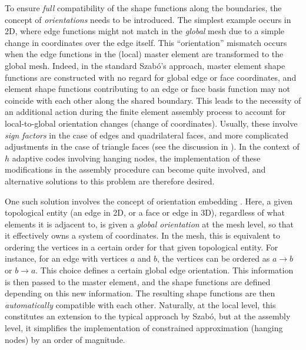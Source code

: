 To ensure \textit{full} compatibility of the shape functions along the boundaries, the concept of \textit{orientations} needs to be introduced.
The simplest example occurs in 2D, where edge functions might not match in the \textit{global} mesh due to a simple change in coordinates over the edge itself.
This ``orientation'' mismatch occurs when the edge functions in the (local) master element are transformed to the global mesh.
Indeed, in the standard Szab\'o's approach, master element shape functions are constructed with no regard for global edge or face coordinates, and element shape functions contributing to an edge or face basis function may not coincide with each other along the shared boundary.
This leads to the necessity of an additional action during the finite element assembly process to account for local-to-global orientation changes (change of coordinates).
Usually, these involve \textit{sign factors} in the case of edges and quadrilateral faces, and more complicated adjustments in the case of triangle faces (see the discussion in \citet[p.50]{hpbook2}).
In the context of $h$ adaptive codes involving hanging nodes, the implementation of these modifications in the assembly procedure can become quite involved, and alternative solutions to this problem are therefore desired.

One such solution involves the concept of orientation embedding \citep{GattoDemkowicz10}.
Here, a given topological entity (an edge in 2D, or a face or edge in 3D), regardless of what elements it is adjacent to, is given a \textit{global orientation} at the mesh level, so that it effectively owns a system of coordinates.
In the mesh, this is equivalent to ordering the vertices in a certain order for that given topological entity.
For instance, for an edge with vertices $a$ and $b$, the vertices can be ordered as $a\to b$ or $b\to a$. 
This choice defines a certain global edge orientation.
This information is then passed to the master element, and the shape functions are defined depending on this new information.
The resulting shape functions are then \textit{automatically} compatible with each other.
Naturally, at the local level, this constitutes an extension to the typical approach by Szab\'o, but at the assembly level, it simplifies the implementation of constrained approximation (hanging nodes) by an order of magnitude.

